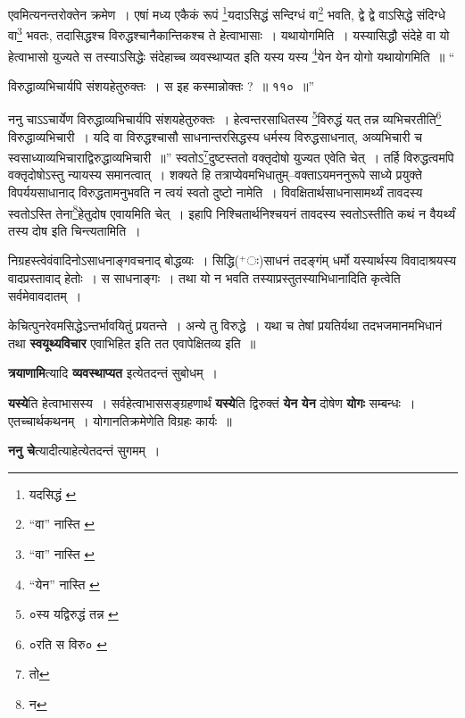 \documentclass[article,12pt,a4paper]{memoir}
\newcommand{\add}[1]{($^{+}$#1)}
\begin{document}
	एवमित्यनन्तरोक्तेन क्रमेण । एषां मध्य एकैकं रूपं \footnote{यदसिद्धं \cite{dp-msA} \cite{dp-msB} \cite{dp-edP} \cite{dp-edH} \cite{dp-edN}}\-यदाऽसिद्धं सन्दिग्धं वा\footnote{“वा” नास्ति \cite{dp-msB}} भवति, द्वे द्वे वाऽसिद्धे संदिग्धे वा\footnote{“वा” नास्ति \cite{dp-msB}} भवतः, तदासिद्धश्च विरुद्धश्चानैकान्तिकश्च ते हेत्वाभासाः । यथायोगमिति । यस्यासिद्धौ संदेहे वा यो हेत्वाभासो युज्यते स तस्याऽसिद्धेः संदेहाच्च व्यवस्थाप्यत इति यस्य यस्य \footnote{“येन” नास्ति \cite{dp-msB}}\-येन येन योगो यथायोगमिति ॥ “
	  
	विरुद्धाव्यभिचार्यपि संशयहेतुरुक्तः । स इह कस्मान्नोक्तः ? ॥ ११० ॥” 
	  
	ननु चाऽऽचार्येण विरुद्धाव्यभिचार्यपि संशयहेतुरुक्तः । हेत्वन्तरसाधितस्य \footnote{०स्य यद्विरुद्धं तन्न \cite{dp-msB} \cite{dp-msD}}\-विरुद्धं यत् तन्न व्यभिचरतीति\footnote{०रति स विरु० \cite{dp-msA} \cite{dp-msB} \cite{dp-edP} \cite{dp-edH} \cite{dp-edE} \cite{dp-edN}} विरुद्धाव्यभिचारी । यदि वा विरुद्धश्चासौ साधनान्तरसिद्धस्य धर्मस्य विरुद्धसाधनात्, अव्यभिचारी च स्वसाध्याव्यभिचाराद्विरुद्धाव्यभिचारी ॥” स्वतोऽ\footnote{तो}\-दुष्टस्ततो वक्तृदोषो युज्यत एवेति चेत् । तर्हि विरुद्धत्वमपि वक्तृदोषोऽस्तु न्यायस्य समानत्वात् । शक्यते हि तत्राप्येवमभिधातुम्--वक्ताऽयमननुरूपे साध्ये प्रयुक्ते विपर्ययसाधानाद् विरुद्धतामनुभवति न त्वयं स्वतो दुष्टो नामेति । विवक्षितार्थसाधनासामर्थ्यं तावदस्य स्वतोऽस्ति तेना\footnote{न}\-हेतुदोष एवायमिति चेत् । इहापि निश्चितार्थनिश्चयनं तावदस्य स्वतोऽस्तीति कथं न वैयर्थ्यं तस्य दोष इति चिन्त्यतामिति ।
	\pend
      

	  \pstart निग्रहस्त्वेवंवादिनोऽसाधनाङ्गवचनाद् बोद्धव्यः । सिद्धि\add{ः}साधनं तदङ्गंम् धर्मो यस्यार्थस्य विवादाश्रयस्य वादप्रस्तावाद् हेतोः । स साधनाङ्गः । तथा यो न भवति तस्याप्रस्तुतस्याभिधानादिति कृत्वेति सर्वमेवावदातम् ।
	\pend
      

	  \pstart केचित्पुनरेवमसिद्धेऽन्तर्भावयितुं प्रयतन्ते । अन्ये तु विरुद्धे । यथा च तेषां प्रयतिर्यथा तदभजमानमभिधानं तथा \textbf{स्वयूथ्यविचार} एवाभिहित इति तत एवापेक्षितव्य इति ॥
	\pend
      

	  \pstart \textbf{त्रयाणामि}त्यादि \textbf{व्यवस्थाप्यत} इत्येतदन्तं सुबोधम् ।
	\pend
      

	  \pstart \textbf{यस्ये}ति हेत्वाभासस्य । सर्वहेत्वाभाससङ्ग्रहणार्थं \textbf{यस्ये}ति द्विरुक्तं \textbf{येन} \leavevmode{} \textbf{येन} दोषेण \textbf{योगः} सम्बन्धः । एतच्चार्थकथनम् । योगानतिक्रमेणेति विग्रहः कार्यः ॥
	\pend
      

	  \pstart \textbf{ननु चे}त्यादीत्याहेत्येतदन्तं सुगमम् ।
	\pend
	  \bigskip
	  \begingroup
	
\end{document}
